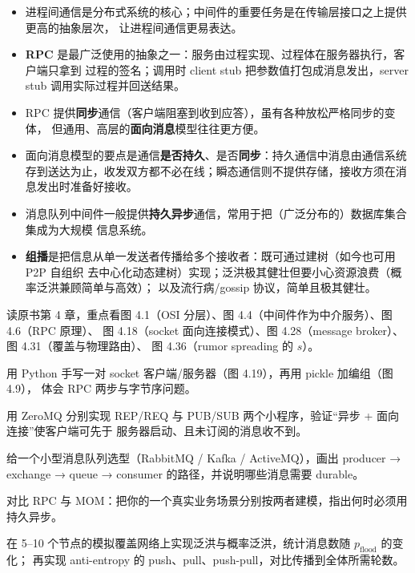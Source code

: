\begin{itemize}
  \item 进程间通信是分布式系统的核心；中间件的重要任务是在传输层接口之上提供更高的抽象层次，
        让进程间通信更易表达。
  \item \textbf{RPC} 是最广泛使用的抽象之一：服务由过程实现、过程体在服务器执行，客户端只拿到
        过程的签名；调用时 client stub 把参数值打包成消息发出，server stub 调用实际过程并回送结果。
  \item RPC 提供\textbf{同步}通信（客户端阻塞到收到应答），虽有各种放松严格同步的变体，
        但通用、高层的\textbf{面向消息}模型往往更方便。
  \item 面向消息模型的要点是通信\textbf{是否持久}、是否\textbf{同步}：持久通信中消息由通信系统
        存到送达为止，收发双方都不必在线；瞬态通信则不提供存储，接收方须在消息发出时准备好接收。
  \item 消息队列中间件一般提供\textbf{持久异步}通信，常用于把（广泛分布的）数据库集合集成为大规模
        信息系统。
  \item \textbf{组播}是把信息从单一发送者传播给多个接收者：既可通过建树（如今也可用 P2P 自组织
        去中心化动态建树）实现；泛洪极其健壮但要小心资源浪费（概率泛洪兼顾简单与高效）；
        以及流行病/gossip 协议，简单且极其健壮。
\end{itemize}

\begin{closeread}
\end{closeread}


\begin{actions}
  \item 读原书第 4 章，重点看图 4.1（OSI 分层）、图 4.4（中间件作为中介服务）、图 4.6（RPC 原理）、
        图 4.18（socket 面向连接模式）、图 4.28（message broker）、图 4.31（覆盖与物理路由）、
        图 4.36（rumor spreading 的 $s$）。
  \item 用 Python 手写一对 socket 客户端/服务器（图 4.19），再用 pickle 加编组（图 4.9），
        体会 RPC 两步与字节序问题。
  \item 用 ZeroMQ 分别实现 REP/REQ 与 PUB/SUB 两个小程序，验证“异步 + 面向连接”使客户端可先于
        服务器启动、且未订阅的消息收不到。
  \item 给一个小型消息队列选型（RabbitMQ / Kafka / ActiveMQ），画出 producer → exchange →
        queue → consumer 的路径，并说明哪些消息需要 durable。
  \item 对比 RPC 与 MOM：把你的一个真实业务场景分别按两者建模，指出何时必须用持久异步。
  \item 在 5–10 个节点的模拟覆盖网络上实现泛洪与概率泛洪，统计消息数随 $p_{\text{flood}}$ 的变化；
        再实现 anti-entropy 的 push、pull、push-pull，对比传播到全体所需轮数。
\end{actions}
